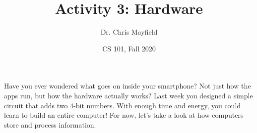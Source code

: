 \documentclass[12pt]{article}
\title{Activity 3: Hardware}
\author{Dr. Chris Mayfield}
\date{CS 101, Fall 2020}
\begin{document}
\maketitle

Have you ever wondered what goes on inside your smartphone?
Not just how the apps run, but how the hardware actually works?
Last week you designed a simple circuit that adds two 4-bit numbers.
With enough time and energy, you could learn to build an entire computer!
For now, let's take a look at how computers store and process information.


\vfill

\end{document}
